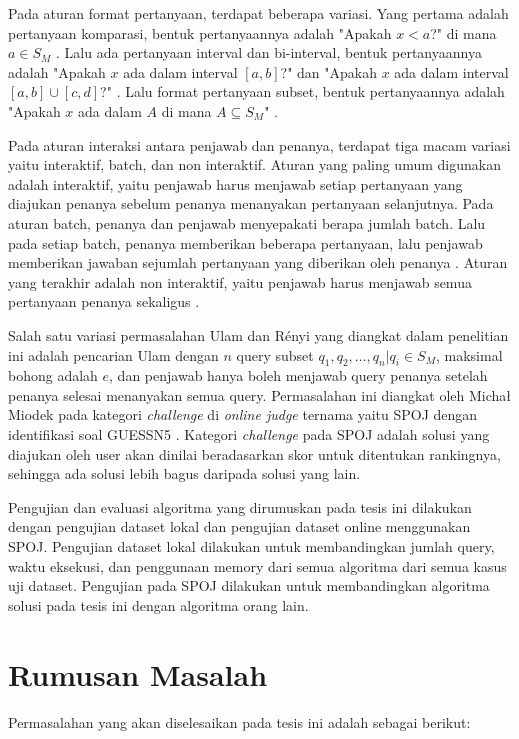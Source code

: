 Pada aturan format pertanyaan, terdapat beberapa variasi. Yang pertama adalah pertanyaan komparasi, bentuk pertanyaannya adalah "Apakah $x<a$?" di mana $a \in S_M$ \cite{Innes} \cite{Auletta1992}. Lalu ada pertanyaan interval dan bi-interval, bentuk pertanyaannya adalah "Apakah $x$ ada dalam interval $[a,b]$?" \cite{Peter2017} dan "Apakah $x$ ada dalam interval $[a,b] \cup [c,d]$?" \cite{Mundici1997}. Lalu format pertanyaan subset, bentuk pertanyaannya adalah "Apakah $x$ ada dalam $A$ di mana $A \subseteq S_M$" \cite{Katona} \cite{Macula1997}.

Pada aturan interaksi antara penjawab dan penanya, terdapat tiga macam variasi yaitu interaktif, batch, dan non interaktif. Aturan yang paling umum digunakan adalah interaktif, yaitu penjawab harus menjawab setiap pertanyaan yang diajukan penanya sebelum penanya menanyakan pertanyaan selanjutnya. Pada aturan batch, penanya dan penjawab menyepakati berapa jumlah batch. Lalu pada setiap batch, penanya memberikan beberapa pertanyaan, lalu penjawab memberikan jawaban sejumlah pertanyaan yang diberikan oleh penanya \cite{Cicalese2000}. Aturan yang terakhir adalah non interaktif, yaitu penjawab harus menjawab semua pertanyaan penanya sekaligus \cite{Macula1997}.

Salah satu variasi permasalahan Ulam dan Rényi yang diangkat dalam penelitian ini adalah pencarian Ulam dengan $n$ query subset ${q_1,q_2,\ldots,q_n} | q_i \in S_M$, maksimal bohong adalah $e$, dan penjawab hanya boleh menjawab query penanya setelah penanya selesai menanyakan semua query. Permasalahan ini diangkat oleh Micha\l{} Miodek pada kategori \textit{challenge} di \textit{online judge} ternama yaitu SPOJ dengan identifikasi soal GUESSN5 \cite{guessn5}. Kategori \textit{challenge} pada SPOJ adalah solusi yang diajukan oleh user akan dinilai beradasarkan skor untuk ditentukan rankingnya, sehingga ada solusi lebih bagus daripada solusi yang lain.

Pengujian dan evaluasi algoritma yang dirumuskan pada tesis ini dilakukan dengan pengujian dataset lokal dan pengujian dataset online menggunakan SPOJ. Pengujian dataset lokal dilakukan untuk membandingkan jumlah query, waktu eksekusi, dan penggunaan memory dari semua algoritma dari semua kasus uji dataset. Pengujian pada SPOJ dilakukan untuk membandingkan algoritma solusi pada tesis ini dengan algoritma orang lain.


\section{Rumusan Masalah}
Permasalahan yang akan diselesaikan pada tesis ini adalah sebagai berikut:

